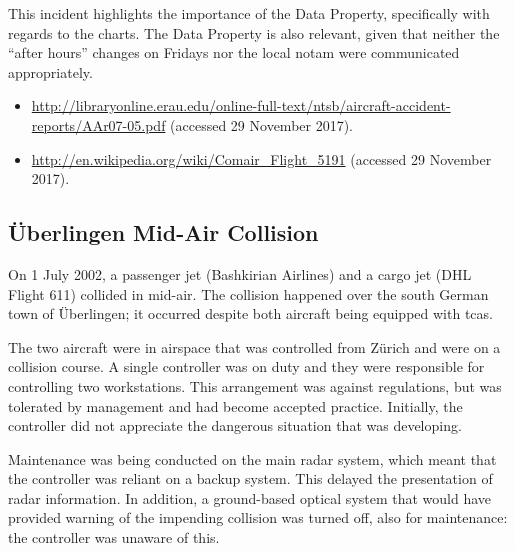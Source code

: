 This incident highlights the importance of the  Data Property, specifically with regards to the charts. The  Data Property is also relevant, given that neither the ``after hours'' changes on Fridays nor the local \gls{notam} were communicated appropriately.

\begin{samepage}
\begin{itemize}
  \item \raggedright{\href{http://libraryonline.erau.edu/online-full-text/ntsb/aircraft-accident-reports/AAr07-05.pdf}{http://libraryonline.erau.edu/online-full-text/ntsb/aircraft-accident-reports/AAr07-05.pdf} (accessed 29 November 2017).}
	\item \raggedright{\href{http://en.wikipedia.org/wiki/Comair_Flight_5191}{http://en.wikipedia.org/wiki/Comair\_Flight\_5191} (accessed 29 November 2017).}
\end{itemize}
\end{samepage}


\subsection{\"Uberlingen Mid-Air Collision} \label{bkm:incacc:uberlingen}
On 1 July 2002, a passenger jet (Bashkirian Airlines) and a cargo jet (DHL Flight 611) collided in mid-air. The collision happened over the south German town of \"Uberlingen; it occurred despite both aircraft being equipped with \gls{tcas}.

The two aircraft were in airspace that was controlled from Z\"urich and were on a collision course. A single controller was on duty and they were responsible for controlling two workstations. This arrangement was against regulations, but was tolerated by management and had become accepted practice. Initially, the controller did not appreciate the dangerous situation that was developing.

Maintenance was being conducted on the main radar system, which meant that the controller was reliant on a backup system. This delayed the presentation of radar information. In addition, a ground-based optical system that would have provided warning of the impending collision was turned off, also for maintenance: the controller was unaware of this.

